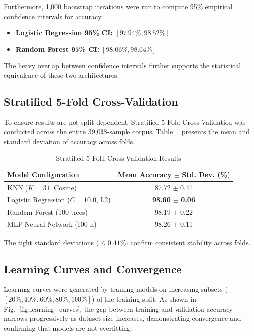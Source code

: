 \documentclass[conference]{IEEEtran}
\begin{document}
Furthermore, 1,000 bootstrap iterations \cite{efron1993} were run to compute 95\% empirical confidence intervals for accuracy:
\begin{itemize}
    \item \textbf{Logistic Regression 95\% CI:} $[97.94\%, 98.52\%]$
    \item \textbf{Random Forest 95\% CI:} $[98.06\%, 98.64\%]$
\end{itemize}
The heavy overlap between confidence intervals further supports the statistical equivalence of these two architectures.

\subsection{Stratified 5-Fold Cross-Validation}
To ensure results are not split-dependent, Stratified 5-Fold Cross-Validation was conducted across the entire 39,098-sample corpus. Table~\ref{tab:kfold} presents the mean and standard deviation of accuracy across folds.

\begin{table}[htbp]
\caption{Stratified 5-Fold Cross-Validation Results}
\label{tab:kfold}
\begin{center}
\begin{tabular}{lc}
\toprule
\textbf{Model Configuration} & \textbf{Mean Accuracy $\pm$ Std. Dev. (\%)} \\
\midrule
KNN ($K=31$, Cosine) & 87.72 $\pm$ 0.41 \\
Logistic Regression ($C=10.0$, L2) & \textbf{98.60 $\pm$ 0.06} \\
Random Forest (100 trees) & 98.19 $\pm$ 0.22 \\
MLP Neural Network (100-h) & 98.26 $\pm$ 0.11 \\
\bottomrule
\end{tabular}
\end{center}
\end{table}

The tight standard deviations ($\le 0.41\%$) confirm consistent stability across folds.

\subsection{Learning Curves and Convergence}
Learning curves were generated by training models on increasing subsets ($[20\%, 40\%, 60\%, 80\%, 100\%]$) of the training split. As shown in Fig.~\ref{fig:learning_curves}, the gap between training and validation accuracy narrows progressively as dataset size increases, demonstrating convergence and confirming that models are not overfitting.
\end{document}
